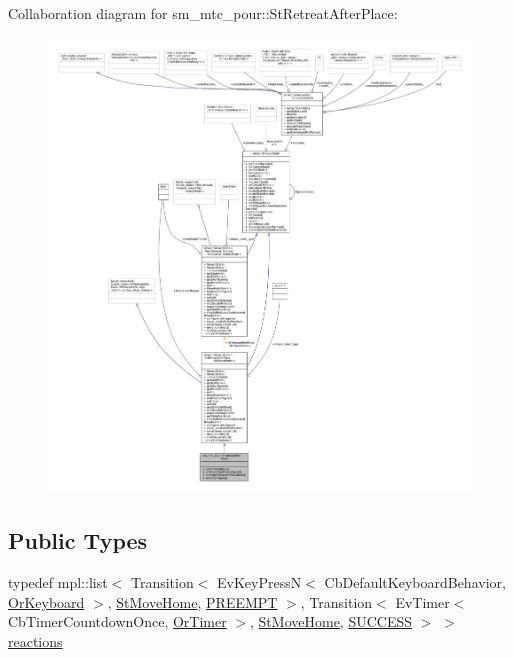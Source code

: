 Collaboration diagram for sm\+\_\+mtc\+\_\+pour\+:\+:St\+Retreat\+After\+Place\+:
\nopagebreak
\begin{figure}[H]
\begin{center}
\leavevmode
\includegraphics[width=350pt]{structsm__mtc__pour_1_1StRetreatAfterPlace__coll__graph}
\end{center}
\end{figure}
\subsection*{Public Types}
\begin{DoxyCompactItemize}
\item 
typedef mpl\+::list$<$ Transition$<$ Ev\+Key\+PressN$<$ Cb\+Default\+Keyboard\+Behavior, \hyperlink{classsm__mtc__pour_1_1OrKeyboard}{Or\+Keyboard} $>$, \hyperlink{structsm__mtc__pour_1_1StMoveHome}{St\+Move\+Home}, \hyperlink{classPREEMPT}{P\+R\+E\+E\+M\+PT} $>$, Transition$<$ Ev\+Timer$<$ Cb\+Timer\+Countdown\+Once, \hyperlink{classsm__mtc__pour_1_1OrTimer}{Or\+Timer} $>$, \hyperlink{structsm__mtc__pour_1_1StMoveHome}{St\+Move\+Home}, \hyperlink{classSUCCESS}{S\+U\+C\+C\+E\+SS} $>$ $>$ \hyperlink{structsm__mtc__pour_1_1StRetreatAfterPlace_a7df36c3674129eacf543de4fe6fb650e}{reactions}
\end{DoxyCompactItemize}
